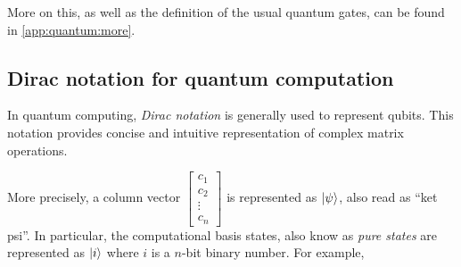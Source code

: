 \noindent More on this, as well as the definition of the usual quantum gates, can be found in \autoref{app:quantum:more}.

\subsection {Dirac notation for quantum computation}
In quantum computing, \emph{Dirac notation} is generally used to represent qubits. This notation provides concise and intuitive representation of complex matrix operations.

More precisely, a column vector $\left[ \begin {array} {c} c_1\\ c_2\\ \vdots\\ c_n \end{array} \right]$ is represented as $|\psi\rangle$, also read as ``ket psi''.  In particular, the computational basis states, also know as \emph{pure states} are represented as $|i\rangle$  where  $i$ is a $n$-bit binary number. For example,
